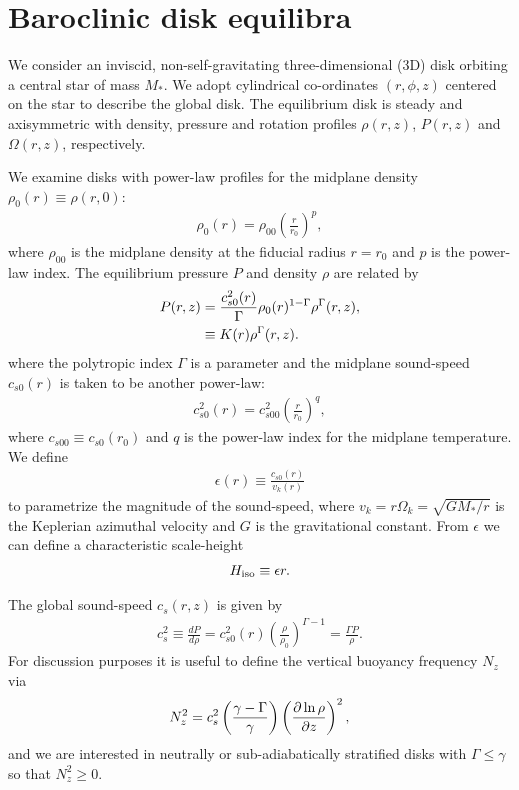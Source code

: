 \section{Baroclinic disk equilibra}
We consider  an inviscid, non-self-gravitating three-dimensional (3D)
disk orbiting a central star of mass $M_*$. 
We adopt cylindrical
co-ordinates $(r,\phi, z)$ centered on the star to describe the global
disk. The equilibrium disk is steady and axisymmetric with density,
pressure and rotation profiles $\rho(r,z)$, $P(r,z)$ and
$\Omega(r,z)$, respectively. 

We examine disks with power-law profiles for the midplane density
$\rho_0(r)\equiv\rho(r,0)$: 
\begin{align}
  \rho_0(r) = \rho_{00}\left(\frac{r}{r_0}\right)^p,
\end{align}
where $\rho_{00}$ is the midplane density at the fiducial radius
$r=r_0$ and $p$ is the power-law index. The equilibrium pressure $P$
and density $\rho$ are related by 
\begin{align}
  P(r,z) &= 
  \frac{c_{s0}^2(r)}{\Gamma}\rho_0(r)^{1-\Gamma}\rho^\Gamma(r,z),\notag\\
  & \equiv K(r)\rho^{\Gamma}(r,z). \label{eqm_press}
\end{align}
where the polytropic index $\Gamma$ is a parameter and 
the midplane sound-speed $c_{s0}(r)$ is taken to be another power-law: 
\begin{align}
  c_{s0}^2(r)=c_{s00}^2\left(\frac{r}{r_0}\right)^q, 
\end{align}
where $c_{s00}\equiv c_{s0}(r_0)$  and $q$ is the power-law index for
the midplane temperature. We define
\begin{align}
  \epsilon(r) \equiv \frac{c_{s0}(r)}{v_k(r)}
\end{align}
to parametrize the magnitude of the sound-speed, where
$v_k=r\Omega_k=\sqrt{GM_*/r}$ is the Keplerian azimuthal velocity and
$G$ is the gravitational constant. From $\epsilon$ we can define a
characteristic scale-height  
\begin{align}
  \Hiso \equiv \epsilon r.%
\end{align} 

The global sound-speed $c_s(r,z)$ is given by
\begin{align}
  c_s^2\equiv \frac{dP}{d\rho} =
  c_{s0}^2(r)\left(\frac{\rho}{\rho_0}\right)^{\Gamma-1} = \frac{\Gamma P}{\rho}. 
\end{align}
For discussion purposes it is useful to define the vertical buoyancy frequency $N_z$ via
\begin{align}
  N_z^2 = c_s^2 \left(\frac{\gamma -
      \Gamma}{\gamma}\right)\left(\frac{\partial\ln\rho}{\partial z}\right)^2,   
\end{align}
and we are interested in neutrally or sub-adiabatically stratified
disks with $\Gamma\leq \gamma$ so that $N_z^2\geq0$.  



